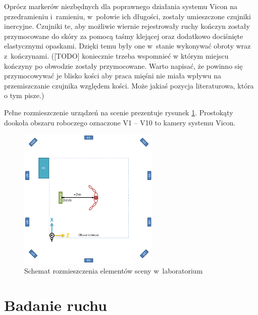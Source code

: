 Oprócz markerów niezbędnych dla poprawnego działania systemu Vicon na przedramieniu i~ramieniu, w~połowie ich długości, zostały umieszczone czujniki inercyjne. Czujniki te, aby możliwie wiernie rejestrowały ruchy kończyn zostały przymocowane do skóry za pomocą taśmy klejącej oraz dodatkowo dociśnięte elastycznymi opaskami. Dzięki temu były one w~stanie wykonywać obroty wraz z~kończynami. ([TODO] koniecznie trzeba wspomnieć w którym miejscu kończyny po obwodzie zostały przymocowane. Warto napisać, że powinno się przymocowywać je blisko kości aby praca mięśni nie miała wpływu na przemiszczanie czujnika względem kości. Może jakiaś pozycja literaturowa, która o tym pisze.)

Pełne rozmieszczenie urządzeń na scenie prezentuje rysunek \ref{fig:experiments:scene}. Prostokąty dookoła obszaru roboczego oznaczone V1 -- V10 to kamery systemu Vicon.
\begin{figure}[!htp]
	\centering
	\includegraphics[width=0.6\textwidth]{images/scene.png}
	\caption{Schemat rozmieszczenia elementów sceny w~laboratorium}
	\label{fig:experiments:scene}
\end{figure}

\section{Badanie ruchu}

